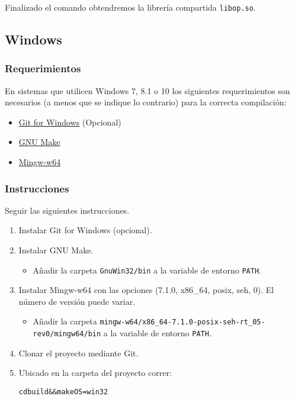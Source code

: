 \documentclass[12pt,a4paper,final]{article}
\begin{document}
			Finalizado el comando obtendremos la librería compartida \texttt{libop.so}.

	\subsection{Windows}
		\subsubsection{Requerimientos}
			En sistemas que utilicen Windows 7, 8.1 o 10 los siguientes requerimientos
			son necesarios (a menos que se indique lo contrario) para la correcta compilación:
			\begin{itemize}
				\item \href{https://git-scm.com/download/win}{Git for Windows} (Opcional)
				\item \href{http://gnuwin32.sourceforge.net/packages/make.htm}{GNU Make}
				\item \href{https://sourceforge.net/projects/mingw-w64/}{Mingw-w64}
			\end{itemize}
		\subsubsection{Instrucciones}
			Seguir las siguientes instrucciones.
			
			\begin{enumerate}
				\item Instalar Git for Windows (opcional).
				\item Instalar GNU Make.
					\begin{itemize}
						\item Añadir la carpeta \texttt{GnuWin32/bin} a la variable de entorno \texttt{PATH}.
					\end{itemize}
				\item Instalar Mingw-w64 con las opciones (7.1.0, x86\_64, posix, seh, 0). El número de versión puede variar.
					\begin{itemize}
						\item Añadir la carpeta \texttt{mingw-w64/x86\_64-7.1.0-posix-seh-rt\_05-rev0/mingw64/bin} a la variable de entorno \texttt{PATH}.
					\end{itemize}
				\item Clonar el proyecto mediante Git.
				\item Ubicado en la carpeta del proyecto correr: 
						\begin{alltt}
							cd build \&\& make OS=win32
						\end{alltt}			
			\end{enumerate}
		
\end{document}
